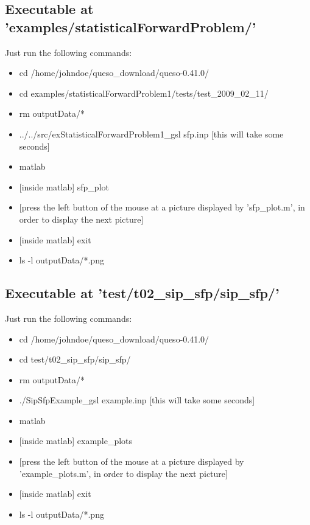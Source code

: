 \subsection{Executable at 'examples/statisticalForwardProblem/'}

Just run the following commands:
\begin{itemize}
\item cd /home/johndoe/queso\_download/queso-0.41.0/
\item cd examples/statisticalForwardProblem1/tests/test\_2009\_02\_11/
\item rm outputData/*
\item ../../src/exStatisticalForwardProblem1\_gsl sfp.inp [this will take some seconds]
\item matlab
\item {[inside matlab] sfp\_plot}
\item {[press the left button of the mouse at a picture displayed by 'sfp\_plot.m', in order to display the next picture]}
\item {[inside matlab]} exit
\item ls -l outputData/*.png
\end{itemize}



\subsection{Executable at 'test/t02\_sip\_sfp/sip\_sfp/'}\label{subsc-t02}

Just run the following commands:
\begin{itemize}
\item cd /home/johndoe/queso\_download/queso-0.41.0/
\item cd test/t02\_sip\_sfp/sip\_sfp/
\item rm outputData/*
\item ./SipSfpExample\_gsl example.inp [this will take some seconds]
\item matlab
\item {[inside matlab]} example\_plots
\item {[press the left button of the mouse at a picture displayed by 'example\_plots.m', in order to display the next picture]}
\item {[inside matlab]} exit
\item ls -l outputData/*.png
\end{itemize}

